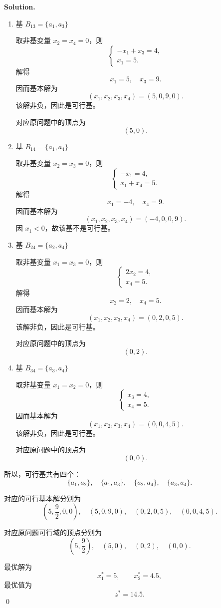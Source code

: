\documentclass[11pt]{article}
\newenvironment{solution}{
\par\noindent\textbf{Solution.}\par\noindent
}{\qed}
\begin{document}
\begin{solution}
\begin{enumerate}
    对应原问题中的顶点为
    \[
    (5,4.5).
    \]

    \item 基 \(B_{13}=\{a_1,a_3\}\)

    取非基变量 \(x_2=x_4=0\)，则
    \[
    \begin{cases}
    -x_1+x_3=4,\\
    x_1=5.
    \end{cases}
    \]
    解得
    \[
    x_1=5,\quad x_3=9.
    \]
    因而基本解为
    \[
    (x_1,x_2,x_3,x_4)=(5,0,9,0).
    \]
    该解非负，因此是可行基。

    对应原问题中的顶点为
    \[
    (5,0).
    \]

    \item 基 \(B_{14}=\{a_1,a_4\}\)

    取非基变量 \(x_2=x_3=0\)，则
    \[
    \begin{cases}
    -x_1=4,\\
    x_1+x_4=5.
    \end{cases}
    \]
    解得
    \[
    x_1=-4,\quad x_4=9.
    \]
    因而基本解为
    \[
    (x_1,x_2,x_3,x_4)=(-4,0,0,9).
    \]
    因 \(x_1<0\)，故该基不是可行基。

    \item 基 \(B_{24}=\{a_2,a_4\}\)

    取非基变量 \(x_1=x_3=0\)，则
    \[
    \begin{cases}
    2x_2=4,\\
    x_4=5.
    \end{cases}
    \]
    解得
    \[
    x_2=2,\quad x_4=5.
    \]
    因而基本解为
    \[
    (x_1,x_2,x_3,x_4)=(0,2,0,5).
    \]
    该解非负，因此是可行基。

    对应原问题中的顶点为
    \[
    (0,2).
    \]

    \item 基 \(B_{34}=\{a_3,a_4\}\)

    取非基变量 \(x_1=x_2=0\)，则
    \[
    \begin{cases}
    x_3=4,\\
    x_4=5.
    \end{cases}
    \]
    因而基本解为
    \[
    (x_1,x_2,x_3,x_4)=(0,0,4,5).
    \]
    该解非负，因此是可行基。

    对应原问题中的顶点为
    \[
    (0,0).
    \]
\end{enumerate}

所以，可行基共有四个：
\[
\{a_1,a_2\},\quad \{a_1,a_3\},\quad \{a_2,a_4\},\quad \{a_3,a_4\}.
\]

对应的可行基本解分别为
\[
\left(5,\frac92,0,0\right),\quad
(5,0,9,0),\quad
(0,2,0,5),\quad
(0,0,4,5).
\]

对应原问题可行域的顶点分别为
\[
\left(5,\frac92\right),\quad
(5,0),\quad
(0,2),\quad
(0,0).
\]

最优解为
\[
x_1^*=5,\qquad x_2^*=4.5,
\]
最优值为
\[
z^*=14.5.
\]
\end{solution}
\end{document}
